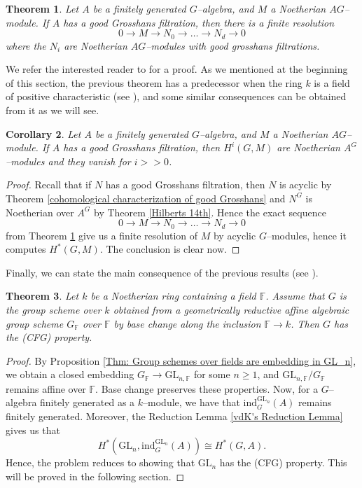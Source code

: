 \documentclass{article}
\theoremstyle{plain}
\newtheorem{Th}{Theorem}[section]
\newtheorem{Cor}[Th]{Corollary}
\theoremstyle{definition}
\newcommand{\GL}{\mathrm{GL}}
\begin{document}
\begin{Th}\label{finite resolution by acyclic modules}
 Let $A$ be a finitely generated $G$--algebra, and $M$ a Noetherian $AG$--module. If $A$ has a good Grosshans filtration, then there is a finite resolution 
 \[
 0\to M\to N_0\to \dots \to N_d \to 0
 \]
 where the $N_i$ are Noetherian $AG$--modules with good grosshans filtrations.
\end{Th}

We refer the interested reader to \cite{vdK15} for a proof. 
As we mentioned at the beginning of this section, the previous theorem has a predecessor when the ring $k$ is a field of positive characteristic (see \cite[Theorem 1.1]{svdK09}), and some similar consequences can be obtained from it as we will see. 

\begin{Cor}\label{Cor: resolution by modules with a good filtration}
   Let $A$ be a finitely generated $G$--algebra, and $M$ a Noetherian $AG$--module. If $A$ has a good Grosshans filtration, then $H^i(G, M)$ are Noetherian $A^G$--modules and they vanish for $i>>0$.
\end{Cor}

\begin{proof}
 Recall that if $N$ has a good Grosshans filtration, then $N$ is acyclic by Theorem \ref{cohomological characterization of good Grosshans} and $N^G$  is Noetherian over $A^G$ by Theorem \ref{Hilberts 14th}. Hence the exact sequence  
 \[
 0\to M\to N_0\to \dots \to N_d \to 0
 \]
 from Theorem \ref{finite resolution by acyclic modules} give us a finite resolution of $M$ by acyclic $G$--modules, hence it computes $H^\ast(G,M)$. The conclusion is clear now.
\end{proof}

Finally, we can state the main consequence of the previous results (see \cite[Theorem 10.1]{vdK15}).

\begin{Th}\label{Th:CFG when k contains a field}
   Let $k$ be a Noetherian ring containing a field $\mathbb{F}$. Assume that $G$ is the group scheme over $k$ obtained from a geometrically reductive affine algebraic group scheme $G_\mathbb{F}$ over $\mathbb{F}$ by base change along the inclusion $\mathbb{F} \to k$. Then $G$ has the (CFG) property.
\end{Th}

\begin{proof}
   By Proposition  \ref{Thm: Group schemes over fields are embedding in GL_n}, we obtain a closed embedding $G_\mathbb{F} \to \GL_{n,\mathbb{F}}$ for some $n \geq 1$, and $\GL_{n,\mathbb{F}}/G_\mathbb{F}$ remains affine over $\mathbb{F}$. Base change preserves these properties. Now, for a $G$--algebra finitely generated as a $k$--module, we have that $\mathrm{ind}_G^{\GL_n}(A)$ remains finitely generated. Moreover, the Reduction Lemma \ref{vdK's Reduction Lemma} gives us that 
   \[
   H^\ast(\GL_n,\mathrm{ind}_G^{\GL_n}(A)) \cong H^\ast(G,A).
   \]
    Hence, the problem reduces to showing that $\GL_n$ has the (CFG) property. This will be proved in the following section.
\end{proof}
\end{document}
